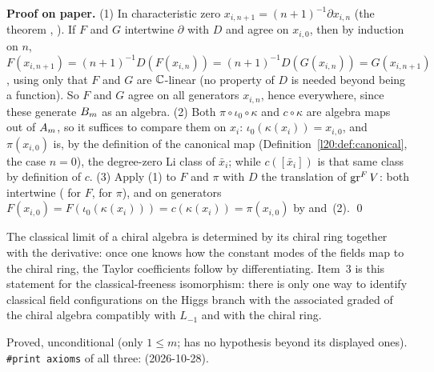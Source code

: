 \textbf{Proof on paper.} (1) In characteristic zero $x_{i,n+1}=(n+1)^{-1}\partial x_{i,n}$ (the theorem ,
). If $F$ and $G$ intertwine $\partial$ with
$D$ and agree on $x_{i,0}$, then by induction on $n$,
$F(x_{i,n+1})=(n+1)^{-1}D(F(x_{i,n}))=(n+1)^{-1}D(G(x_{i,n}))=G(x_{i,n+1})$, using only that $F$ and $G$ are ${\mathbb{C}}$-linear
(no property of $D$ is needed beyond being a function). So $F$
and $G$ agree on all generators $x_{i,n}$, hence everywhere, since these generate $B_m$ as an algebra. (2) Both
$\pi\circ\iota_0\circ\kappa$ and $c\circ\kappa$ are algebra maps out of $A_m$, so it suffices to compare them on $x_i$:
$\iota_0(\kappa(x_i))=x_{i,0}$, and $\pi(x_{i,0})$ is, by the definition of the canonical map
(Definition~\ref{l20:def:canonical}, the case $n=0$), the degree-zero Li class of $\bar x_i$; while $c([\bar x_i])$ is that
same class by definition of $c$. (3) Apply (1) to $F$ and $\pi$ with $D$ the translation of $\operatorname{gr}^F V$: both intertwine
( for $F$,  for $\pi$), and on generators
$F(x_{i,0})=F(\iota_0(\kappa(x_i)))=c(\kappa(x_i))=\pi(x_{i,0})$ by  and~(2). \qed

\begin{physics}
The classical limit of a chiral algebra is determined by its chiral ring together with the derivative: once one knows how the
constant modes of the fields map to the chiral ring, the Taylor coefficients follow by differentiating. Item~3 is this
statement for the classical-freeness isomorphism: there is only one way to identify classical field configurations on the Higgs
branch with the associated graded of the chiral algebra compatibly with $L_{-1}$ and with the chiral ring.
\end{physics}

\begin{status}
Proved, unconditional (only $1\le m$;  has no hypothesis beyond its displayed ones).
\texttt{\#print axioms} of all three:  (2026-10-28).
\end{status}

